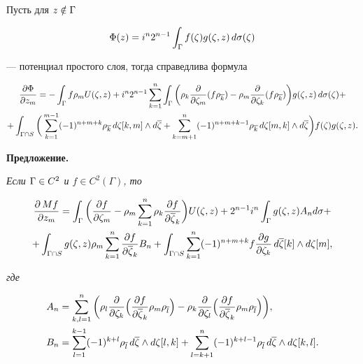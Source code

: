 \begin{lem}


Пусть для $z\notin\Gamma$


$$


\Phi\z=i^n2^{n-1}\ig f(\zt)g\ztz\,d\sigma(\zt)


$$


--- потенциал простого слоя, тогда справедлива формула


\begin{multline*}


\Pd{\Phi}{z_m}=-\ig f\r{m}U\ztz


+i^n2^{n-1}\sm\ig\bigg(\r{k}\pdd{\zt_m}(f\ovlr{k})-\r{m}\pdd{\zt_k}


(f\ovlr{k})\bigg)g\ztz\,d\sigma(\zt)+ \\


+\igs\bigg(\sum_{k=1}^{m-1}(-1)^{n+m+k}\ovlr{k}\,d\zt[k,m]\ld d\ovl\zt


+\sum_{k=m+1}^n(-1)^{n+m+k-1}\ovlr{k}\,d\zt[m,k]\ld


d\ovl\zt\bigg)f(\zt)g\ztz.


\end{multline*}


\end{lem}





{\bf Предложение.}


{\it Если $\Gamma\in C^2$ и $f\in C^2(\Gamma)$, то}


\begin{multline}


\Pd{\,Mf}{z_m}


=\ig\bigg(\Pd{f}{\zt_m}-\r{m}\sm\r{k}\Pd{f}{\ovl\zt_k}\bigg)U(\zeta,z)+


2^{n-1}i^n\ig g(\zeta,z)A_nd\sigma+\\


+\igs g(\zeta,z)\r{m}\sm\Pd{f}{\ovl\zt_k} B_n


+\igs\sm(-1)^{n+m+k} f\Pd{g}{\zt_k}\,d\ovl\zt[k]\ld d\zt[m],


\end{multline}


{\it где}


\begin{align*}


A_n&=\sum_{k,l=1}^n\bigg(\r{l}\pdd{\zt_k}\Big(\Pd{f}{\ovl\zt_k}


\r{m}\ovlr{l}\Big)


-\r{k}\pdd{\zt_l}\Big(\Pd{f}{\ovl\zt_k}\r{m}\ovlr{l}\Big)\bigg),\\


%


B_n&=\sum_{l=1}^{k-1}(-1)^{k+l}\ovlr{l}  \,d\ovl\zt\ld d\zt[l,k]


+\sum_{l=k+1}^n(-1)^{k+l-1}\ovlr{l}\,d\ovl\zt\ld d\zt[k,l].


\end{align*}





